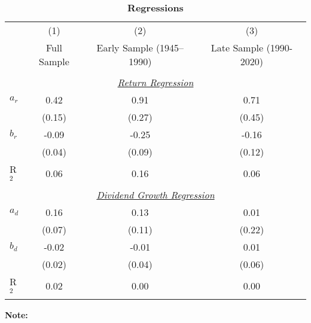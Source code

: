 \medskip
\def\sym#1{\ifmmode^{#1}\else\(^{#1}\)\fi}

\begin{table}[H]
\caption{\textbf{Regressions} }
 \label{tab:reg}
\centering
\vspace*{-1ex}
\begin{tabular*}{\hsize}{@{\hskip\tabcolsep\extracolsep\fill}l*{3}{c}}

\toprule\toprule
                    &\multicolumn{1}{c}{(1)}  &\multicolumn{1}{c}{(2)} &\multicolumn{1}{c}{(3)}        \\ [0.25em]
                    &\multicolumn{1}{c}{Full Sample}  &\multicolumn{1}{c}{Early Sample (1945--1990)}  &\multicolumn{1}{c}{Late Sample (1990-2020)}        \\ 
\midrule \\


\multicolumn{4}{c}{{\underline{\em Return Regression}}} \\ [0.5em] %
$a_r$          &     0.42     & 0.91    & 0.71\\
                    &     (0.15)  & (0.27)   & (0.45)    \\[0.5em]
$b_r$          &       -0.09    & -0.25 & -0.16    \\
                    &     (0.04)  & (0.09)   & (0.12)    \\[0.5em]
R$^2$      &       0.06       & 0.16 & 0.06 \\ [1em]

\multicolumn{4}{c}{ {\underline{\em Dividend Growth Regression }}} \\ [0.5em]%

$a_d$          &     0.16     & 0.13    & 0.01\\
                    &     (0.07)  & (0.11)   & (0.22)    \\[0.5em]
$b_d$          &       -0.02    & -0.01 & 0.01    \\
                    &     (0.02)  & (0.04)   & (0.06)    \\[0.5em]
R$^2$      &       0.02       & 0.00 & 0.00  \\


\bottomrule\bottomrule


\end{tabular*}
\begin{minipage}[c]{\textwidth}  \small \medskip
\textbf{Note:} 
\end{minipage}
\end{table}


